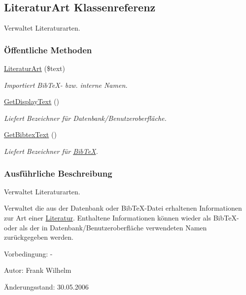 \hypertarget{classLiteraturArt}{
\subsection{Literatur\-Art Klassenreferenz}
\label{classLiteraturArt}
}
Verwaltet Literaturarten.  


\subsubsection*{\"{O}ffentliche Methoden}
\begin{CompactItemize}
\item 
\hyperlink{classLiteraturArt_b3312217430531ed7821a46a39c49af7}{Literatur\-Art} (\$text)
\begin{CompactList}\small\item\em Importiert Bib\-Te\-X- bzw. interne Namen. \item\end{CompactList}\item 
\hyperlink{classLiteraturArt_43f747a6c5d840a22ddcd7e46d27cba0}{Get\-Display\-Text} ()
\begin{CompactList}\small\item\em Liefert Bezeichner für Datenbank/Benutzeroberfläche. \item\end{CompactList}\item 
\hyperlink{classLiteraturArt_01e1a2acd95df1ae0bb22e57b70a63de}{Get\-Bibtex\-Text} ()
\begin{CompactList}\small\item\em Liefert Bezeichner für \hyperlink{classBibTeX}{Bib\-Te\-X}. \item\end{CompactList}\end{CompactItemize}


\subsubsection{Ausf\"{u}hrliche Beschreibung}
Verwaltet Literaturarten. 

Verwaltet die aus der Datenbank oder Bib\-Te\-X-Datei erhaltenen Informationen zur Art einer \hyperlink{classLiteratur}{Literatur}. Enthaltene Informationen können wieder als Bib\-Te\-X- oder als der in Datenbank/Benutzeroberfläche verwendeten Namen zurückgegeben werden. \begin{Desc}
\item[Vorbedingung:]-\end{Desc}
\begin{Desc}
\item[Autor:]Frank Wilhelm \end{Desc}
\begin{Desc}
\item[Änderungsstand:]30.05.2006 \end{Desc}




